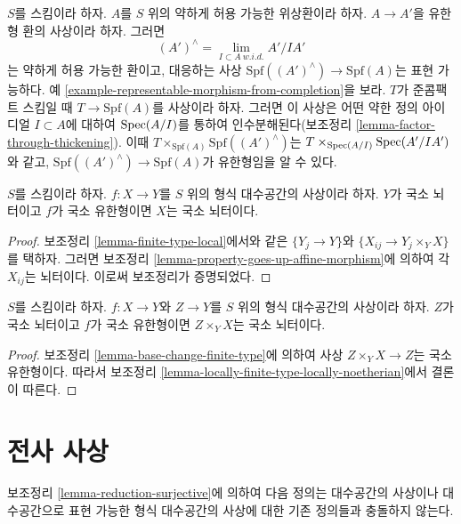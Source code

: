 \begin{example}
\label{example-finite-type-from-finite-type-ring-map}
$S$를 스킴이라 하자. $A$를 $S$ 위의 약하게 허용 가능한 위상환이라
하자. $A \to A'$을 유한형 환의 사상이라 하자. 그러면
$$
(A')^\wedge = \lim_{I \subset A\ w.i.d.} A'/IA'
$$
는 약하게 허용 가능한 환이고, 대응하는 사상
$\text{Spf}((A')^\wedge) \to \text{Spf}(A)$는 표현 가능하다.
예 \ref{example-representable-morphism-from-completion}을 보라.
$T$가 준콤팩트 스킴일 때 $T \to \text{Spf}(A)$를 사상이라 하자.
그러면 이 사상은 어떤 약한 정의 아이디얼 $I \subset A$에 대하여
$\mathop{\mathrm{Spec}}(A/I)$를 통하여 인수분해된다(보조정리
\ref{lemma-factor-through-thickening}). 이때
$T \times_{\text{Spf}(A)} \text{Spf}((A')^\wedge)$는
$T \times_{\mathop{\mathrm{Spec}}(A/I)} \mathop{\mathrm{Spec}}(A'/IA')$와 같고,
$\text{Spf}((A')^\wedge) \to \text{Spf}(A)$가 유한형임을 알 수 있다.
\end{example}

\begin{lemma}
\label{lemma-locally-finite-type-locally-noetherian}
$S$를 스킴이라 하자. $f : X \to Y$를 $S$ 위의 형식 대수공간의
사상이라 하자. $Y$가 국소 뇌터이고 $f$가 국소 유한형이면 $X$는
국소 뇌터이다. %
\end{lemma}

\begin{proof}
보조정리 \ref{lemma-finite-type-local}에서와 같은
$\{Y_j \to Y\}$와 $\{X_{ij} \to Y_j \times_Y X\}$를 택하자.
그러면 보조정리 \ref{lemma-property-goes-up-affine-morphism}에 의하여
각 $X_{ij}$는 뇌터이다. 이로써 보조정리가 증명되었다.
\end{proof}

\begin{lemma}
\label{lemma-fibre-product-Noetherian}
$S$를 스킴이라 하자. $f : X \to Y$와 $Z \to Y$를 $S$ 위의 형식
대수공간의 사상이라 하자. $Z$가 국소 뇌터이고 $f$가 국소
유한형이면 $Z \times_Y X$는 국소 뇌터이다.
\end{lemma}

\begin{proof}
보조정리 \ref{lemma-base-change-finite-type}에 의하여 사상
$Z \times_Y X \to Z$는 국소 유한형이다. 따라서 보조정리
\ref{lemma-locally-finite-type-locally-noetherian}에서 결론이 따른다.
\end{proof}

\section{전사 사상}
\label{section-surjective}

\noindent
보조정리 \ref{lemma-reduction-surjective}에 의하여 다음 정의는
대수공간의 사상이나 대수공간으로 표현 가능한 형식 대수공간의
사상에 대한 기존 정의들과 충돌하지 않는다.

